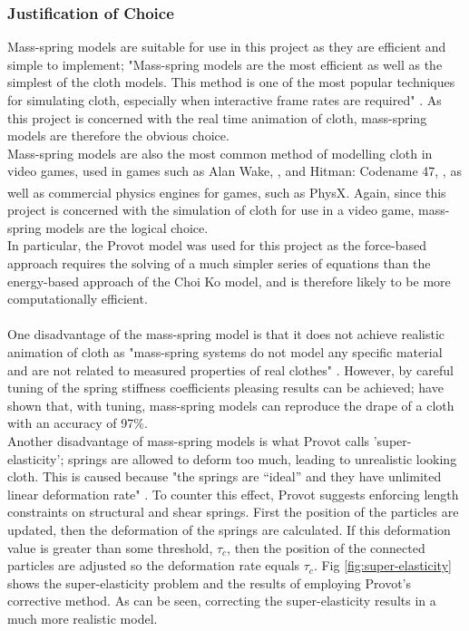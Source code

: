 \subsubsection{Justification of Choice}
Mass-spring models are suitable for use in this project as they are efficient and simple to implement; "Mass-spring models are the most efficient as well as the simplest of the cloth models.  This method is one of the most popular techniques for simulating cloth, especially when interactive frame rates are required" \parencite[2]{Zink2007}. As this project is concerned with the real time animation of cloth, mass-spring models are therefore the obvious choice.
\\Mass-spring models are also the most common method of modelling cloth in video games, used in games such as Alan Wake, \parencite[2]{Enqvist2010}, and Hitman: Codename 47, \parencite[1]{Jakobsen2005}, as well as commercial physics engines for games, such as PhysX\textsuperscript{\textregistered}. Again, since this project is concerned with the simulation of cloth for use in a video game, mass-spring models are the logical choice.
\\In particular, the Provot model was used for this project as the force-based approach requires the solving of a much simpler series of equations than the energy-based approach of the Choi Ko model, and is therefore likely to be more computationally efficient.
\\\\One disadvantage of the mass-spring model is that it does not achieve realistic animation of cloth as "mass-spring systems do not model any specific material and are not related to measured properties of real clothes" \parencite[3]{Wacker2005a}. However, by careful tuning of the spring stiffness coefficients pleasing results can be achieved; \textcite{Mongus2012} have shown that, with tuning, mass-spring models can reproduce the drape of a cloth with an accuracy of 97\%.
\\Another disadvantage of mass-spring models is what Provot calls 'super-elasticity'; springs are allowed to deform too much, leading to unrealistic looking cloth. This is caused because "the springs are “ideal” and they have unlimited linear deformation rate" \parencite[3]{Vassilev2001}. To counter this effect, Provot suggests enforcing length constraints on structural and shear springs. First the position of the particles are updated, then the deformation of the springs are calculated. If this deformation value is greater than some threshold, $\tau_{c}$, then the position of the connected particles are adjusted so the deformation rate equals $\tau_{c}$. Fig \ref{fig:super-elasticity} shows the super-elasticity problem and the results of employing Provot's corrective method. As can be seen, correcting the super-elasticity results in a much more realistic model.

